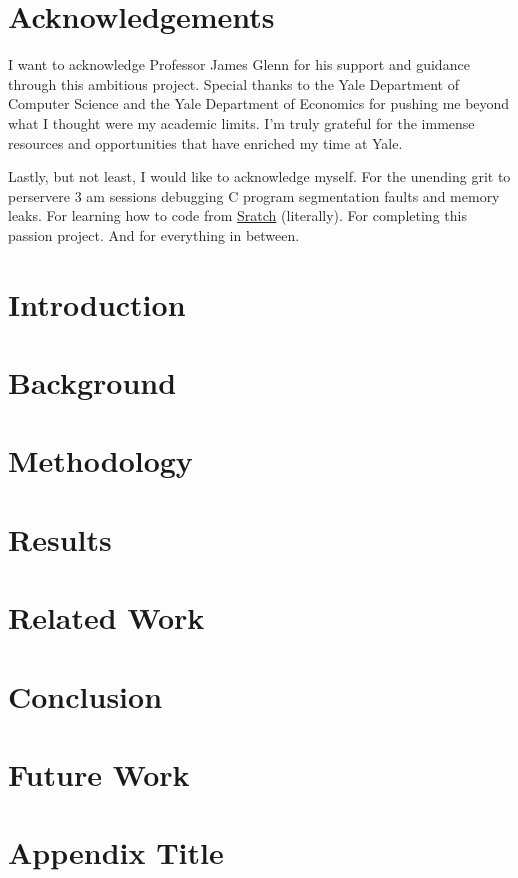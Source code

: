 \documentclass[12pt,twoside]{report}
\begin{document}


\chapter*{Acknowledgements}
I want to acknowledge Professor James Glenn for his support and guidance through this ambitious project. Special thanks to the Yale Department of Computer Science and the Yale Department of Economics for pushing me beyond what I thought were my academic limits.
I'm truly grateful for the immense resources and opportunities that have enriched my time at Yale.

Lastly, but not least, I would like to acknowledge myself. For the unending grit to perservere 3 am sessions debugging C program segmentation faults and memory leaks. For learning how to code from \href{https://scratch.mit.edu/}{Sratch} (literally). For completing this passion project.
And for everything in between.
{
  \hypersetup{linkcolor=black}
  \tableofcontents
}

\clearpage




\chapter{Introduction}


\chapter{Background} \label{ch:background}


\chapter{Methodology} \label{ch:methodology}



\chapter{Results} \label{ch:results}


\chapter{Related Work} \label{ch:relatedwork}


\chapter{Conclusion} \label{ch:conclusion}


\chapter{Future Work} \label{ch:futurework}



\printbibliography
\appendix
\chapter{Appendix Title} \label{ch:appendices}
 
\end{document}
